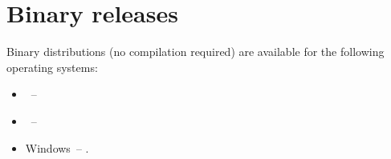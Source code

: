 %
%
%


\chapter{Binary releases}\label{chap:bin}

Binary distributions (no compilation required) are available for the following operating systems:
\begin{itemize}
 \item \linux~-- 
 \item \macosx~-- 
 \item Windows~-- .
\end{itemize}



